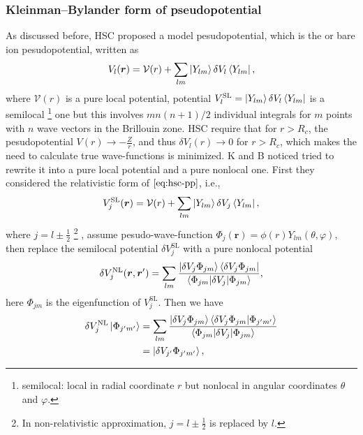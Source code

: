 
\subsubsection{Kleinman--Bylander form of pseudopotential}
As discussed before,
HSC proposed a model pesudopotential, which is the or bare ion pesudopotential, written as
\begin{equation}\label{eq:hsc-pp}
	V_l(\bm{r}) = \mathcal{V} (r) + \sum_{l m} \ket{Y_{lm}} \delta V_l \bra{Y_{lm}},
\end{equation}
where $\mathcal{V} (r)$ is a pure local potential, potential
$V_l^\text{SL} = \ket{Y_{lm}} \delta V_l \bra{Y_{lm}}$ is a semilocal
\footnote{
	semilocal: local in radial coordinate $r$ but nonlocal in angular coordinates $\theta$ and $\varphi$.
}
one but this involves $m n (n+1) / 2$ individual integrals for $m$ points
with $n$ wave vectors in the Brillouin zone.
HSC require that for $r > R_c$, the pesudopotential
$V (r) \rightarrow - \frac{ Z }{ r }$, and thus
$\delta V_l (r) \rightarrow 0 $ for $r > R_c$,
which makes the need to calculate true wave-functions is minimized.
K and B \cite{Kleinman:1982cx} noticed tried to rewrite it into a pure local potential and a pure
nonlocal one. First they considered the relativistic form of $\eqref{eq:hsc-pp}$,
i.e.,
\begin{equation}
	V_j^\text{SL} (\bm{r}) = \mathcal{V} (r) + \sum_{lm} \ket{Y_{lm}} \delta V_j \bra{Y_{lm}},
\end{equation}
where $j = l \pm \frac{ 1 }{ 2 }$
\footnote{
	In non-relativistic approximation, $j = l \pm \frac{ 1 }{ 2 }$ is replaced by $l$.
}
, assume pesudo-wave-function
$\Phi_j (\bm{r}) = \phi(r) Y_{lm} (\theta, \varphi)$,
then replace the semilocal potential $\delta V_j^\text{SL}$ with a pure nonlocal potential
\begin{equation}\label{eq:nl-pp}
	\delta V_j^\text{NL} (\bm{r}, \bm{r}')
	= \sum_{lm} \frac{ \ket{\delta V_j \Phi_{jm}}  \bra{\delta V_j \Phi_{jm}} }{
		\braket{ \Phi_{jm} | \delta V_j | \Phi_{jm} } },
\end{equation}
here $\Phi_{jm}$ is the eigenfunction of $V_j^\text{SL}$.
Then we have
\begin{equation}\label{eq:vnl-phi}
	\begin{split}
		\delta V_j^\text{NL} \ket{\Phi_{j'm'}}
		&=
		\sum_{lm} \frac{
			\ket{\delta V_j \Phi_{jm}}  \braket{\delta V_j \Phi_{jm} | \Phi_{j'm'} }
		}{
			\braket{ \Phi_{jm} | \delta V_j | \Phi_{jm} }
		} \\
		&= \ket{ \delta V_{j'} \Phi_{j'm'} },
	\end{split}
\end{equation}
